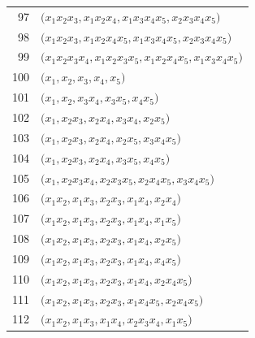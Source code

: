{\begin{longtable}{@{}r>{\raggedright\arraybackslash}p{}@{}}
97 & \(\bigl(x_{1}x_{2}x_{3},\allowbreak x_{1}x_{2}x_{4},\allowbreak x_{1}x_{3}x_{4}x_{5},\allowbreak x_{2}x_{3}x_{4}x_{5}\bigr)\) \\
98 & \(\bigl(x_{1}x_{2}x_{3},\allowbreak x_{1}x_{2}x_{4}x_{5},\allowbreak x_{1}x_{3}x_{4}x_{5},\allowbreak x_{2}x_{3}x_{4}x_{5}\bigr)\) \\
99 & \(\bigl(x_{1}x_{2}x_{3}x_{4},\allowbreak x_{1}x_{2}x_{3}x_{5},\allowbreak x_{1}x_{2}x_{4}x_{5},\allowbreak x_{1}x_{3}x_{4}x_{5}\bigr)\) \\
100 & \(\bigl(x_{1},\allowbreak x_{2},\allowbreak x_{3},\allowbreak x_{4},\allowbreak x_{5}\bigr)\) \\
101 & \(\bigl(x_{1},\allowbreak x_{2},\allowbreak x_{3}x_{4},\allowbreak x_{3}x_{5},\allowbreak x_{4}x_{5}\bigr)\) \\
102 & \(\bigl(x_{1},\allowbreak x_{2}x_{3},\allowbreak x_{2}x_{4},\allowbreak x_{3}x_{4},\allowbreak x_{2}x_{5}\bigr)\) \\
103 & \(\bigl(x_{1},\allowbreak x_{2}x_{3},\allowbreak x_{2}x_{4},\allowbreak x_{2}x_{5},\allowbreak x_{3}x_{4}x_{5}\bigr)\) \\
104 & \(\bigl(x_{1},\allowbreak x_{2}x_{3},\allowbreak x_{2}x_{4},\allowbreak x_{3}x_{5},\allowbreak x_{4}x_{5}\bigr)\) \\
105 & \(\bigl(x_{1},\allowbreak x_{2}x_{3}x_{4},\allowbreak x_{2}x_{3}x_{5},\allowbreak x_{2}x_{4}x_{5},\allowbreak x_{3}x_{4}x_{5}\bigr)\) \\
106 & \(\bigl(x_{1}x_{2},\allowbreak x_{1}x_{3},\allowbreak x_{2}x_{3},\allowbreak x_{1}x_{4},\allowbreak x_{2}x_{4}\bigr)\) \\
107 & \(\bigl(x_{1}x_{2},\allowbreak x_{1}x_{3},\allowbreak x_{2}x_{3},\allowbreak x_{1}x_{4},\allowbreak x_{1}x_{5}\bigr)\) \\
108 & \(\bigl(x_{1}x_{2},\allowbreak x_{1}x_{3},\allowbreak x_{2}x_{3},\allowbreak x_{1}x_{4},\allowbreak x_{2}x_{5}\bigr)\) \\
109 & \(\bigl(x_{1}x_{2},\allowbreak x_{1}x_{3},\allowbreak x_{2}x_{3},\allowbreak x_{1}x_{4},\allowbreak x_{4}x_{5}\bigr)\) \\
110 & \(\bigl(x_{1}x_{2},\allowbreak x_{1}x_{3},\allowbreak x_{2}x_{3},\allowbreak x_{1}x_{4},\allowbreak x_{2}x_{4}x_{5}\bigr)\) \\
111 & \(\bigl(x_{1}x_{2},\allowbreak x_{1}x_{3},\allowbreak x_{2}x_{3},\allowbreak x_{1}x_{4}x_{5},\allowbreak x_{2}x_{4}x_{5}\bigr)\) \\
112 & \(\bigl(x_{1}x_{2},\allowbreak x_{1}x_{3},\allowbreak x_{1}x_{4},\allowbreak x_{2}x_{3}x_{4},\allowbreak x_{1}x_{5}\bigr)\) \\

\end{longtable}}

